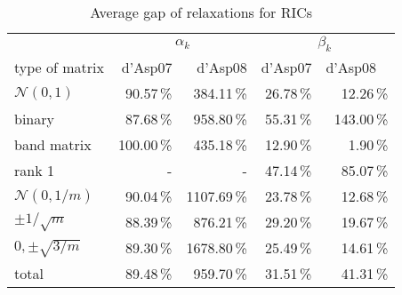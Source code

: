 \begin{table} 
 \begin{scriptsize} \caption{Average gap of relaxations for RICs} 
 \label{lhsRhsGap} 
 \begin{tabular*}{0.48\textwidth}{@{}l@{\;\;\extracolsep{\fill}}rrrr@{}}\toprule 
  & \multicolumn{2}{c}{$\alpha_k$} & \multicolumn{2}{c}{$\beta_k$} \\ 
\cmidrule(r){2-3} \cmidrule(l){4-5} 
type of matrix & d'Asp07 & d'Asp08 & d'Asp07 & d'Asp08 \ 
\\ \midrule 
$\mathcal{N}(0,1)$ & \num{90.57}\,\% & \num{384.11}\,\% & \num{26.78}\,\% & \num{12.26}\,\% \\ 
binary & \num{87.68}\,\% & \num{958.80}\,\% & \num{55.31}\,\% & \num{143.00}\,\% \\ 
band matrix & \num{100.00}\,\% & \num{435.18}\,\% & \num{12.90}\,\% & \num{1.90}\,\% \\ 
rank 1& - &- & \num{47.14}\,\% & \num{85.07}\,\% \\ 
$\mathcal{N}(0,1/m)$ & \num{90.04}\,\% & \num{1107.69}\,\% & \num{23.78}\,\% & \num{12.68}\,\% \\ 
$\pm 1/\sqrt{m}$ & \num{88.39}\,\% & \num{876.21}\,\% & \num{29.20}\,\% & \num{19.67}\,\% \\ 
$0, \pm \sqrt{3/m}$ & \num{89.30}\,\% & \num{1678.80}\,\% & \num{25.49}\,\% & \num{14.61}\,\% \\ 
\midrule 
total &  \num{89.48}\,\% & \num{959.70}\,\% & \num{31.51}\,\% & \num{41.31}\,\%\\ 
\bottomrule 
 \end{tabular*} 
 \end{scriptsize} 
 \end{table} 